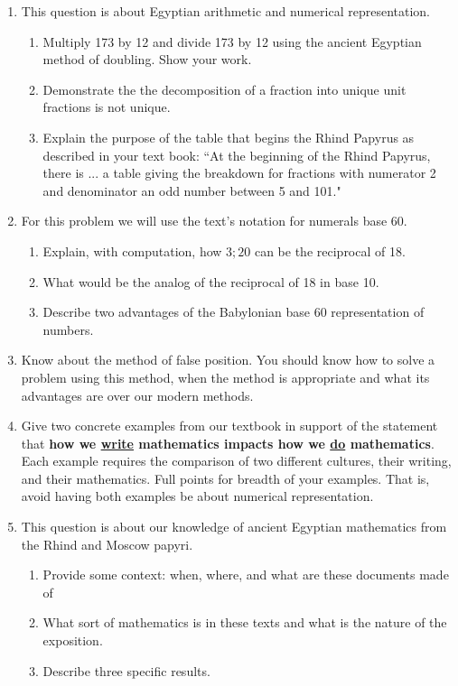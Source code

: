\documentclass[12pt]{article}
\renewcommand{\emph}[1]{\textsf{\textbf{#1}}}
\begin{document}
\begin{enumerate}
\item This question is about Egyptian arithmetic and numerical representation.
	\begin{enumerate}
	\item Multiply 173 by 12 and divide 173 by 12 using the ancient Egyptian method of doubling. Show your work.
	\item Demonstrate the the decomposition of a fraction into unique unit fractions is not unique.
	\item Explain the purpose of the table that begins the Rhind Papyrus as described in your text book: ``At the beginning of the Rhind Papyrus, there is ... a table giving the breakdown for fractions with numerator 2 and denominator an odd number between 5 and 101."
	\end{enumerate}
\item For this problem we will use the text's notation for numerals base 60.
	\begin{enumerate}
	\item Explain, with computation, how $3;20$ can be the reciprocal of 18.
	\item What would be the analog of the reciprocal of 18 in base 10.
	\item Describe two advantages of the Babylonian base 60 representation of numbers.
	\end{enumerate}
\item Know about the method of false position. You should know how to solve a problem using this method, when the method is appropriate and what its advantages are over our modern methods.
\item Give two concrete examples from our textbook in support of the statement that \emph{how we \underline{write} mathematics impacts how we \underline{do} mathematics}. Each example requires the comparison of two different cultures, their writing, and their mathematics. Full points for breadth of your examples. That is, avoid having both examples be about numerical representation.
\item This question is about our knowledge of ancient Egyptian mathematics from the Rhind and Moscow papyri.
	\begin{enumerate}
	\item Provide some context: when, where, and what are these documents made of
	\item What sort of mathematics is in these texts and what is the nature of the exposition.
	\item Describe three specific results.

\end{enumerate}
\end{enumerate}
\end{document}
